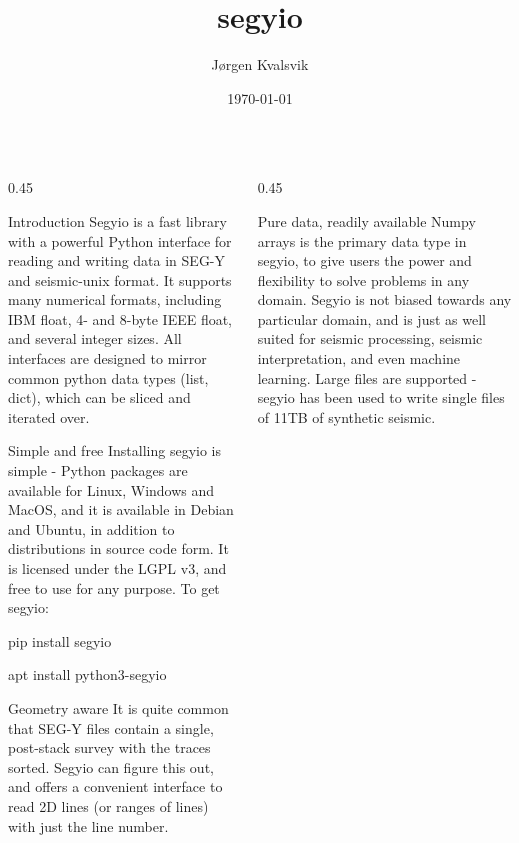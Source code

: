 \documentclass[final]{beamer}
\title[segyio] {segyio}
\author[Kvalsvik]{Jørgen Kvalsvik}
\institute[Equinor]{Equinor}
\date{\today}
\begin{document}
\begin{frame}{}
\begin{columns}[t]
\newcommand{\columnmargin}{0.45\textwidth}

\begin{column}{\columnmargin}
    \begin{block}{\large Introduction}
        Segyio is a fast library with a powerful Python interface for reading
        and writing data in SEG-Y and seismic-unix format. It supports many
        numerical formats, including IBM float, 4- and 8-byte IEEE float, and
        several integer sizes. All interfaces are designed to mirror common
        python data types (list, dict), which can be sliced and iterated over.
    \end{block}

    \begin{block}{\large Simple and free}
        Installing segyio is simple - Python packages are available for Linux,
        Windows and MacOS, and it is available in Debian and Ubuntu, in
        addition to distributions in source code form. It is licensed under the
        LGPL v3, and free to use for any purpose. To get segyio:

        \begin{description}[align=right,labelwidth=1cm]
            \item [\emph{pip}] pip install segyio
            \item [\emph{debian/ubuntu}] apt install python3-segyio
        \end{description}
    \end{block}

    \begin{block}{\large Geometry aware}
        It is quite common that SEG-Y files contain a single, post-stack survey
        with the traces sorted. Segyio can figure this out, and offers a
        convenient interface to read 2D lines (or ranges of lines) with just
        the line number.
        \begin{minipage}{0.9\textwidth}
            \vspace{1em}
            
        \end{minipage}
    \end{block}
\end{column}

\begin{column}{\columnmargin}

    \begin{block}{\large Pure data, readily available}
        Numpy arrays is the primary data type in segyio, to give users the
        power and flexibility to solve problems in any domain. Segyio is not
        biased towards any particular domain, and is just as well suited for
        seismic processing, seismic interpretation, and even machine learning.
        Large files are supported - segyio has been used to write single files
        of 11TB of synthetic seismic.
    \end{block}


\end{column}
\end{columns}
\end{frame}
\end{document}
